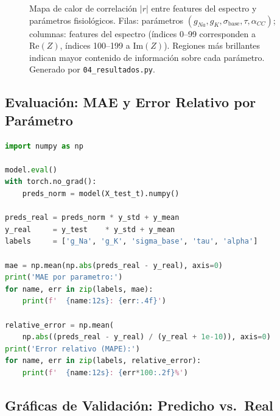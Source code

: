 \documentclass[12pt]{article}
\begin{document}
\begin{figure}[H]
\centering
{}
\caption{Mapa de calor de correlaci\'on $|r|$ entre features del espectro y par\'ametros
fisiol\'ogicos. Filas: par\'ametros $(g_{Na}, g_K, \sigma_{\text{base}}, \tau, \alpha_{CC})$;
columnas: features del espectro (\'indices 0--99 corresponden a $\text{Re}(Z)$,
\'indices 100--199 a $\text{Im}(Z)$). Regiones m\'as brillantes indican mayor
contenido de informaci\'on sobre cada par\'ametro. Generado por \texttt{04\_resultados.py}.}
\label{fig:corr}
\end{figure}

\subsection{Evaluaci\'on: MAE y Error Relativo por Par\'ametro}

\begin{lstlisting}[language=Python, caption={M\'etricas cuantitativas del modelo inverso con desnormalizaci\'on.}]
import numpy as np

model.eval()
with torch.no_grad():
    preds_norm = model(X_test_t).numpy()

preds_real = preds_norm * y_std + y_mean
y_real     = y_test    * y_std + y_mean
labels     = ['g_Na', 'g_K', 'sigma_base', 'tau', 'alpha']

mae = np.mean(np.abs(preds_real - y_real), axis=0)
print('MAE por parametro:')
for name, err in zip(labels, mae):
    print(f'  {name:12s}: {err:.4f}')

relative_error = np.mean(
    np.abs((preds_real - y_real) / (y_real + 1e-10)), axis=0)
print('Error relativo (MAPE):')
for name, err in zip(labels, relative_error):
    print(f'  {name:12s}: {err*100:.2f}%')
\end{lstlisting}

\subsection{Gr\'aficas de Validaci\'on: Predicho vs.\ Real}
\end{document}
